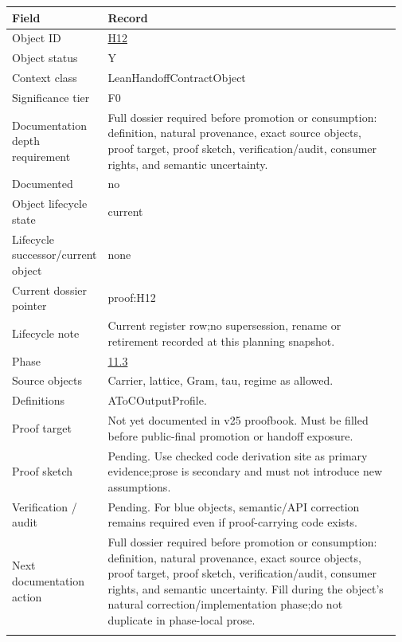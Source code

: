 \begin{longtable}{L{0.16\linewidth} L{0.81\linewidth}}
\hline
\textbf{Field} & \textbf{Record}\\
\hline
Object ID & \hyperlink{object-row-H12}{H12}\\
\hline\addlinespace[0.20em]
Object status & Y\\
\hline\addlinespace[0.20em]
Context class & LeanHandoffContractObject\\
\hline\addlinespace[0.20em]
Significance tier & F0\\
\hline\addlinespace[0.20em]
Documentation depth requirement & Full dossier required before promotion or consumption: definition, natural provenance, exact source objects, proof target, proof sketch, verification/\allowbreak{}audit, consumer rights, and semantic uncertainty.\\
\hline\addlinespace[0.20em]
Documented & no\\
\hline\addlinespace[0.20em]
Object lifecycle state & current\\
\hline\addlinespace[0.20em]
Lifecycle successor/\allowbreak{}current object & none\\
\hline\addlinespace[0.20em]
Current dossier pointer & proof:H12\\
\hline\addlinespace[0.20em]
Lifecycle note & Current register row;\newline no supersession, rename or retirement recorded at this planning snapshot.\\
\hline\addlinespace[0.20em]
Phase & \hyperlink{phase-row-11-3}{11.3}\\
\hline\addlinespace[0.20em]
Source objects & Carrier, lattice, Gram, tau, regime as allowed.\\
\hline\addlinespace[0.20em]
Definitions & AToCOutputProfile.\\
\hline\addlinespace[0.20em]
Proof target & Not yet documented in v25 proofbook. Must be filled before public-final promotion or handoff exposure.\\
\hline\addlinespace[0.20em]
Proof sketch & Pending. Use checked code derivation site as primary evidence;\newline prose is secondary and must not introduce new assumptions.\\
\hline\addlinespace[0.20em]
Verification /\allowbreak{} audit & Pending. For blue objects, semantic/\allowbreak{}API correction remains required even if proof-carrying code exists.\\
\hline\addlinespace[0.20em]
Next documentation action & Full dossier required before promotion or consumption: definition, natural provenance, exact source objects, proof target, proof sketch, verification/\allowbreak{}audit, consumer rights, and semantic uncertainty. Fill during the object's natural correction/\allowbreak{}implementation phase;\newline do not duplicate in phase-local prose.\\
\hline\addlinespace[0.20em]
\end{longtable}
